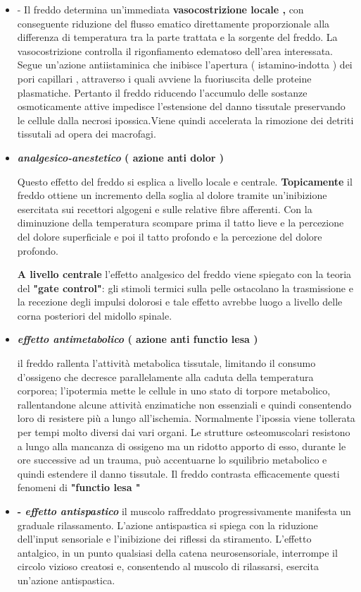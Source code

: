 \begin{itemize}
\item 
- Il freddo determina un'immediata \textbf{vasocostrizione locale ,} con
conseguente riduzione del flusso ematico direttamente proporzionale alla
differenza di temperatura tra la parte trattata e la sorgente del
freddo. La vasocostrizione controlla il rigonfiamento edematoso
dell'area interessata. Segue un'azione antiistaminica che inibisce
l'apertura ( istamino-indotta ) dei pori capillari , attraverso i quali
avviene la fuoriuscita delle proteine plasmatiche. Pertanto il freddo
riducendo l'accumulo delle sostanze osmoticamente attive impedisce
l'estensione del danno tissutale preservando le cellule dalla necrosi
ipossica.Viene quindi accelerata la rimozione dei detriti tissutali ad
opera dei macrofagi.

\item
  \textbf{\emph{analgesico-anestetico} ( azione anti dolor )}


Questo effetto del freddo si esplica a livello locale e centrale.
\textbf{Topicamente} il freddo ottiene un incremento della soglia al
dolore tramite un'inibizione esercitata sui recettori algogeni e sulle
relative fibre afferenti. Con la diminuzione della temperatura scompare
prima il tatto lieve e la percezione del dolore superficiale e poi il
tatto profondo e la percezione del dolore profondo.

\textbf{A livello centrale} l'effetto analgesico del freddo viene
spiegato con la teoria del \textbf{"gate control"}: gli stimoli termici
sulla pelle ostacolano la trasmissione e la recezione degli impulsi
dolorosi e tale effetto avrebbe luogo a livello delle corna posteriori
del midollo spinale.

\item
  \textbf{\emph{effetto antimetabolico} ( azione anti functio lesa )}


il freddo rallenta l'attività metabolica tissutale, limitando il consumo
d'ossigeno che decresce parallelamente alla caduta della temperatura
corporea; l'ipotermia mette le cellule in uno stato di torpore
metabolico, rallentandone alcune attività enzimatiche non essenziali e
quindi consentendo loro di resistere più a lungo all'ischemia.
Normalmente l'ipossia viene tollerata per tempi molto diversi dai vari
organi. Le strutture osteomuscolari resistono a lungo alla mancanza di
ossigeno ma un ridotto apporto di esso, durante le ore successive ad un
trauma, può accentuarne lo squilibrio metabolico e quindi estendere il
danno tissutale. Il freddo contrasta efficacemente questi fenomeni di
\textbf{"functio lesa "}

 \item 
\textbf{- \emph{effetto antispastico }}il muscolo raffreddato
progressivamente manifesta un graduale rilassamento. L'azione
antispastica si spiega con la riduzione dell'input sensoriale e
l'inibizione dei riflessi da stiramento. L'effetto antalgico, in un
punto qualsiasi della catena neurosensoriale, interrompe il circolo
vizioso creatosi e, consentendo al muscolo di rilassarsi, esercita
un'azione antispastica.
\end{itemize}
